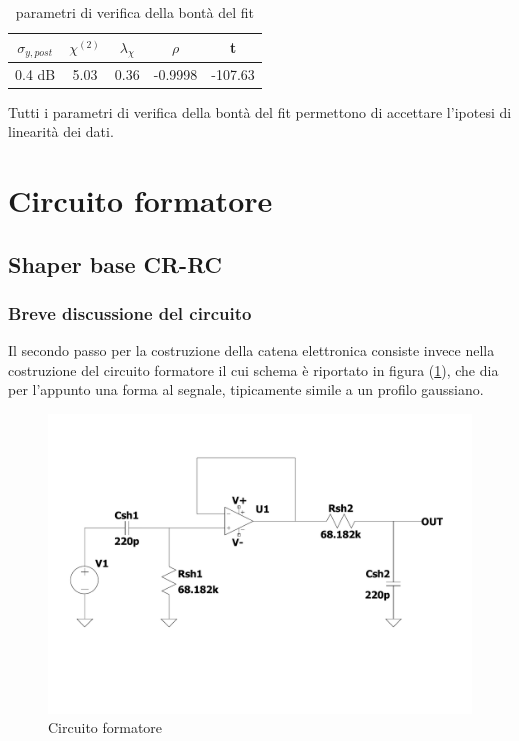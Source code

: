 \documentclass{article}
\begin{document}
\begin{table}[ht]
    \centering
    \begin{tabular}{ccccc}
        \toprule
        $\sigma_{y, post}$    &$\chi^{(2)}$    &$\lambda_{\chi}$   &$\rho$ &t      \\
        \midrule
        0.4 dB                &5.03            &0.36               &-0.9998&-107.63\\
        \bottomrule
    \end{tabular}
    \caption{parametri di verifica della bontà del fit}
\end{table}

Tutti i parametri di verifica della bontà del fit permettono di accettare
l'ipotesi di linearità dei dati.



\section{Circuito formatore}
\subsection{Shaper base CR-RC}
\subsubsection{Breve discussione del circuito}

Il secondo passo per la costruzione della catena elettronica consiste invece nella costruzione del circuito formatore il cui schema è 
riportato in figura (\ref{fig:shaper}), che dia per l'appunto una forma al segnale, tipicamente simile a un profilo gaussiano.

\begin{center}
    \begin{figure}[H]
    \centering
    \includegraphics[scale=0.3, angle=0]{shaper.pdf}
    \caption{Circuito formatore}
    \label{fig:shaper}
    \end{figure}
\end{center}
    
\end{document}
